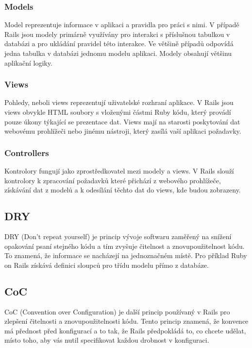 \subsubsection{Models}
Model reprezentuje informace v aplikaci a pravidla pro práci s nimi. V případě Rails jsou modely primárně využívány pro interakci s příslušnou tabulkou v databázi a pro ukládání pravidel této interakce. Ve většině případů odpovídá jedna tabulka v databázi jednomu modelu aplikaci. Modely obsahují většinu aplikační logiky.

\subsubsection{Views}
Pohledy, neboli views reprezentují uživatelské rozhraní aplikace. V Rails jsou views obvykle HTML soubory s vloženými částmi Ruby kódu, který provádí pouze úkony týkající se prezentace dat. Views mají na starosti poskytování dat webovému prohlížeči nebo jinému nástroji, který zasílá vaší aplikaci požadavky.

\subsubsection{Controllers}
Kontrolory fungují jako zprostředkovatel mezi modely a views. V Rails slouží kontrolory k zpracování požadavků které přichází z webového prohlížeče, získávání dat z modelů a k odesílání těchto dat do views, kde budou zobrazeny.

\subsection{DRY}
\label{dry}
DRY (Don’t repeat yourself) \cite{dry} je princip vývoje softwaru zaměřený na snížení opakování psaní stejného kódu a tím zvyšuje čitelnost a znovupoužitelnost kódu. To znamená, že informace se nacházejí na jednoznačném místě. Pro příklad Ruby on Rails získává definici sloupců pro třídu modelu přímo z databáze.  

\subsection{CoC}
\label{coc}
CoC (Convention over Configuration) \cite{coc} je další princip používaný v Rails pro zlepšení čitelnosti a znovupoužitelnosti kódu. Tento princip znamená, že konvence má přednost před konfigurací a to tak, že Rails předpokládá to, co chcete udělat, místo toho, aby vás nutil specifikovat každou drobnost v konfiguraci. 

